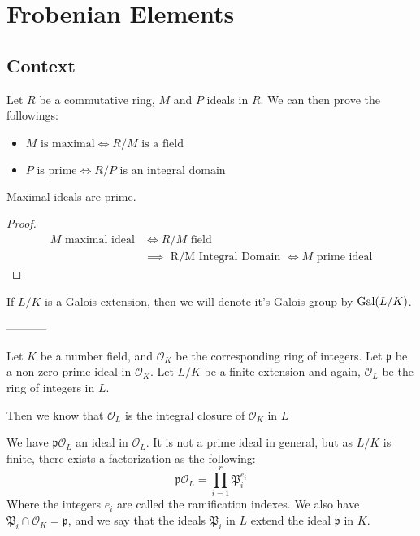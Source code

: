 \section{Frobenian Elements}
\subsection{Context}
Let $R$ be a commutative ring, $M$ and $P$ ideals in $R$. We can then prove the followings:
\begin{theorem}
    \begin{itemize}
        \item $M \text{ is maximal} \iff R/M \text{ is a field}$
        \item $P \text{ is prime} \iff R/P \text{ is an integral domain}$
    \end{itemize}
\end{theorem}
\begin{property}
    Maximal ideals are prime. 
\end{property}
\begin{proof}
    \begin{align*}
        M \text{ maximal ideal} &\iff R/M \text{ field}\\
                                &\implies \text{ R/M Integral Domain } \iff M \text{ prime ideal}
    \end{align*}
\end{proof}

If $L/K$ is a Galois extension, then we will denote it's Galois group by $\text{Gal}(L/K)$.



-----------



Let $K$ be a number field, and $\mathcal{O}_K$ be the corresponding ring of integers.
Let $\mathfrak{p}$ be a non-zero prime ideal in $\mathcal{O}_K$.
Let $L/K$ be a finite extension and again, $\mathcal{O}_L$ be the ring of integers in $L$.

Then we know that $\mathcal{O}_L$ is the integral closure of $\mathcal{O}_K$ in $L$

We have $\mathfrak{p}\mathcal{O}_L$ an ideal in $\mathcal{O}_L$.
It is not a prime ideal in general, but as $L/K$ is finite, there exists a factorization as the following:
$$
\mathfrak{p}\mathcal{O}_L = \prod_{i=1}^r \mathfrak{P}_i^{e_i}
$$
Where the integers $e_i$ are called the ramification indexes.
We also have $\mathfrak{P}_i \cap \mathcal{O}_K = \mathfrak{p}$, and we say that the ideals $\mathfrak{P}_i$ in $L$ extend the ideal $\mathfrak{p}$ in $K$.

